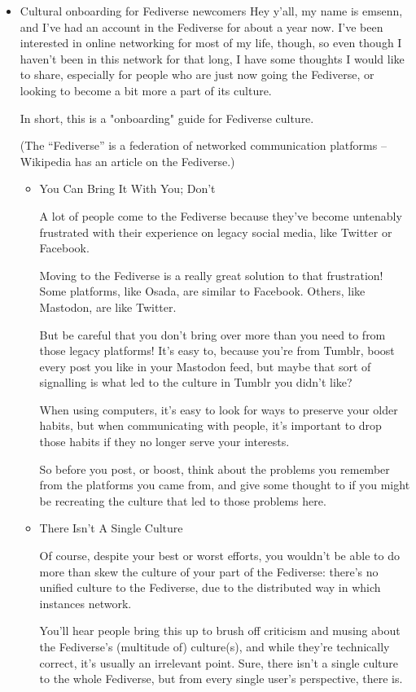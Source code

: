 \documentclass[11pt]{article}
\begin{document}
\begin{itemize}
\item Cultural onboarding for Fediverse newcomers
\label{sec:orgb46ceea}
Hey y’all, my name is emsenn, and I’ve had an account in the Fediverse for about a year now. I’ve been interested in online networking for most of my life, though, so even though I haven’t been in this network for that long, I have some thoughts I would like to share, especially for people who are just now going the Fediverse, or looking to become a bit more a part of its culture.

In short, this is a "onboarding" guide for Fediverse culture.

(The “Fediverse” is a federation of networked communication platforms – Wikipedia has an article on the Fediverse.)
\begin{itemize}
\item You Can Bring It With You; Don’t
\label{sec:org07c4123}

A lot of people come to the Fediverse because they’ve become untenably frustrated with their experience on legacy social media, like Twitter or Facebook.

Moving to the Fediverse is a really great solution to that frustration! Some platforms, like Osada, are similar to Facebook. Others, like Mastodon, are like Twitter.

But be careful that you don’t bring over more than you need to from those legacy platforms! It’s easy to, because you’re from Tumblr, boost every post you like in your Mastodon feed, but maybe that sort of signalling is what led to the culture in Tumblr you didn’t like?

When using computers, it’s easy to look for ways to preserve your older habits, but when communicating with people, it’s important to drop those habits if they no longer serve your interests.

So before you post, or boost, think about the problems you remember from the platforms you came from, and give some thought to if you might be recreating the culture that led to those problems here.
\item There Isn’t A Single Culture
\label{sec:org1787d9b}

Of course, despite your best or worst efforts, you wouldn’t be able to do more than skew the culture of your part of the Fediverse: there’s no unified culture to the Fediverse, due to the distributed way in which instances network.

You’ll hear people bring this up to brush off criticism and musing about the Fediverse’s (multitude of) culture(s), and while they’re technically correct, it’s usually an irrelevant point. Sure, there isn’t a single culture to the whole Fediverse, but from every single user’s perspective, there is.


\end{itemize}
\end{itemize}
\end{document}
